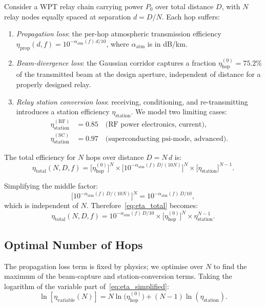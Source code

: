 \documentclass[aps,prd,twocolumn,superscriptaddress]{revtex4-2}
\newcommand{\alphaatm}{\alpha_\mathrm{atm}}
\newcommand{\etahop}{\eta_\mathrm{hop}}
\newcommand{\etastat}{\eta_\mathrm{station}}
\begin{document}
Consider a WPT relay chain carrying power $P_0$ over total distance
$D$, with $N$ relay nodes equally spaced at separation $d = D/N$.
Each hop suffers:
\begin{enumerate}
\item \emph{Propagation loss}: the per-hop atmospheric transmission
  efficiency $\eta_\mathrm{prop}(d,f) = 10^{-\alpha_\mathrm{atm}(f)\,d/10}$,
  where $\alphaatm$ is in dB/km.
\item \emph{Beam-divergence loss}: the Gaussian corridor captures
  a fraction $\etahop^{(0)} = 75.2\%$ of the transmitted beam
  at the design aperture, independent of distance for a properly
  designed relay.
\item \emph{Relay station conversion loss}: receiving, conditioning,
  and re-transmitting introduces a station efficiency $\etastat$.
  We model two limiting cases:
  \begin{align}
    \etastat^\mathrm{(RF)} &= 0.85 \quad\text{(RF power electronics, current)},\\
    \etastat^\mathrm{(SC)} &= 0.97 \quad\text{(superconducting psi-mode, advanced)}.
  \end{align}
\end{enumerate}

The total efficiency for $N$ hops over distance $D = N\,d$ is:
\begin{equation}
\boxed{
\eta_\mathrm{total}(N,D,f) =
\bigl[\etahop^{(0)}\bigr]^N
\times
\bigl[10^{-\alphaatm(f)\,D/(10N)}\bigr]^N
\times
\bigl[\etastat\bigr]^{N-1}.
}
\label{eq:eta_total}
\end{equation}

Simplifying the middle factor:
\begin{equation}
\bigl[10^{-\alphaatm(f)\,D/(10N)}\bigr]^N
= 10^{-\alphaatm(f)\,D/10},
\label{eq:prop_factor}
\end{equation}
which is independent of $N$.  Therefore~\eqref{eq:eta_total} becomes:
\begin{equation}
\eta_\mathrm{total}(N,D,f) =
10^{-\alphaatm(f)\,D/10}
\times
\bigl[\etahop^{(0)}\bigr]^N
\times
\etastat^{N-1}.
\label{eq:eta_simplified}
\end{equation}

\subsection{Optimal Number of Hops}

The propagation loss term is fixed by physics; we optimise over $N$ to
find the maximum of the beam-capture and station-conversion terms.
Taking the logarithm of the variable part of~\eqref{eq:eta_simplified}:
\begin{equation}
\ln[\eta_\mathrm{variable}(N)] =
N\ln\bigl(\etahop^{(0)}\bigr) + (N-1)\ln(\etastat).
\label{eq:log_var}
\end{equation}
\end{document}
